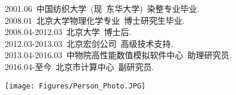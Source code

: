 \thispagestyle{fancy}   %
\vskip 40pt
\begin{minipage}[b]{0.69\textwidth}
{\hspace*{69pt} }
\vskip 25pt
\hspace*{-10pt} {\fontsize{15.0pt}{10.0pt}\selectfont{姜骏，北京市计算中心~~副研究员}}
\vskip 4pt
\hspace*{-10pt} 2001.06~中国纺织大学~(现~东华大学)~染整专业毕业.\\
\hspace*{-10pt} 2008.01~北京大学物理化学专业~博士研究生毕业.\\
\hspace*{-10pt} 2008.04-2012.03~北京大学~博士后.\\
\hspace*{-10pt} 2012.03-2013.03~北京宏剑公司~高级技术支持.\\
\hspace*{-10pt} 2013.04-2016.03~中物院高性能数值模拟软件中心~助理研究员.\\
\hspace*{-10pt} 2016.04-至今~北京市计算中心~副研究员.
\end{minipage}
\hskip 15pt
\begin{minipage}[b]{0.19\textwidth}
\vspace{17pt}
\texttt{[image: Figures/Person\_Photo.JPG]}
\end{minipage}
\vskip 30pt

